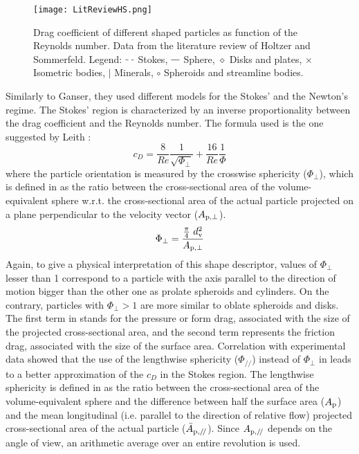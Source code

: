 		\begin{figure}
			\centering
			\texttt{[image: LitReviewHS.png]}
			\caption[Drag coefficient of different shaped particles as function of the Reynolds number.]{Drag coefficient of different shaped particles as function of the Reynolds number. Data from the literature review of Holtzer and Sommerfeld. \cite{HoltzerSommerfeld-2008}
			Legend: $ \tikz[baseline] {\draw[dashed] (0,.7ex)--(.3,.7ex) ;} $ Stokes, 
			$ \tikz[baseline] {\draw (0,.7ex)--(.3,.7ex) ;} $ Sphere,
			$ \diamond $ Disks and plates, $ \times $ Isometric bodies, $ | $ Minerals, $ \circ $ Spheroids and streamline bodies.}
			\label{fig: LitReviewHS}
		\end{figure}

		Similarly to Ganser, they used different models for the Stokes' and the Newton's regime. The Stokes' region is characterized by an inverse proportionality between the drag coefficient and the Reynolds number. The formula used is the one suggested by Leith \cite{Leith-1987}:
		\begin{equation}
			c_D = \frac{8}{Re} \frac{1}{\sqrt{\Phi_{\perp}}} + \frac{16}{Re} \frac{1}{\Phi}
			\label{eq: Leith}
		\end{equation}
		where the particle orientation is measured by the crosswise sphericity ($ \Phi_{\perp} $), which is defined in  as the ratio between the cross-sectional area of the volume-equivalent sphere w.r.t. the cross-sectional area of the actual particle projected on a plane perpendicular to the velocity vector ($ A_{\textup{p}, \perp} $).
		\begin{equation}
			\Phi_{\perp} = \dfrac{\frac{\pi}{4}\ d_{\textup{v}}^2} {A_{\textup{p}, \perp}}
			\label{eq: Crosswise}
		\end{equation}
		Again, to give a physical interpretation of this shape descriptor, values of $ \Phi_{\perp} $ lesser than 1 correspond to a particle with the axis parallel to the direction of motion bigger than the other one as prolate spheroids and cylinders. On the contrary, particles with $ \Phi_{\perp} > 1 $ are more similar to oblate spheroids and disks.
		The first term in  stands for the pressure or form drag, associated with the size of the projected cross-sectional area, and the second term represents the friction drag, associated with the size of the surface area. Correlation with experimental data showed that the use of the lengthwise sphericity ($ \Phi_{/\!/} $) instead of $ \Phi_{\perp} $ in  leads to a better approximation of the $ c_D $ in the Stokes region. The lengthwise sphericity is defined in  as the ratio between the cross-sectional area of the volume-equivalent sphere and the difference between half the surface area ($ A_{\textup{p}} $) and the mean longitudinal (i.e. parallel to the direction of relative flow) projected cross-sectional area of the actual particle ($ \bar{A}_{\textup{p},/\!/} $). Since $ A_{\textup{p},/\!/} $ depends on the angle of view, an arithmetic average over an entire revolution is used.
